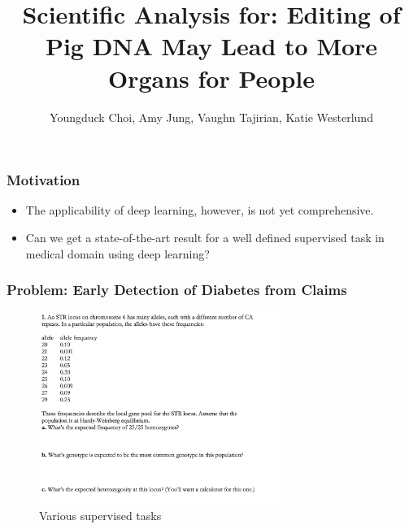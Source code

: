 \documentclass{beamer}
\title{Scientific Analysis for:
Editing of Pig DNA May Lead to More Organs for People}
\author{Youngduck Choi, Amy Jung, Vaughn Tajirian, Katie Westerlund }
\institute{CILVR Lab, New York University}
\begin{document}
 
\frame{\titlepage}
 
\begin{frame}
\frametitle{Motivation}
\begin{itemize}
An

\bigskip

\item The applicability of deep learning, however, is not yet comprehensive.  

\bigskip

\item Can we get a state-of-the-art result for a well defined supervised task in medical domain
using deep learning?
\end{itemize}
\end{frame}

\begin{frame}
\frametitle{Problem: Early Detection of Diabetes from Claims}
\begin{figure}[htb]
\includegraphics[width=0.7\textwidth]{genetics-9-1.png}
\caption{Various supervised tasks}
\end{figure} 
\end{frame}
\end{document}

